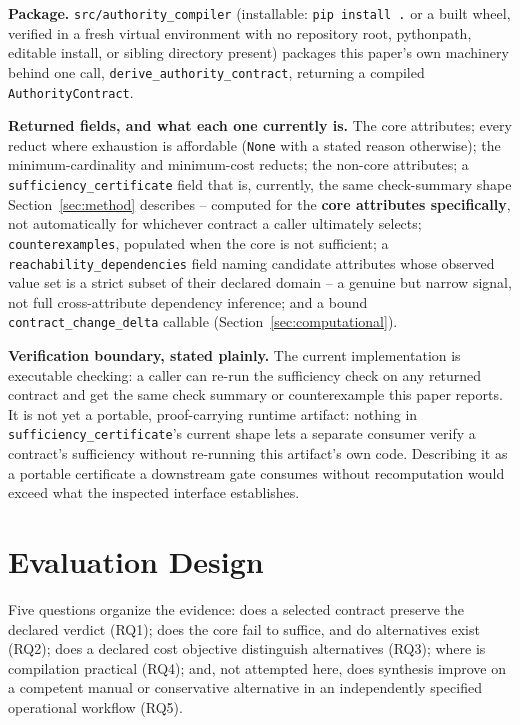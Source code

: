 \documentclass[11pt,a4paper]{article}
\theoremstyle{definition}
\begin{document}
\noindent\textbf{Package.} \texttt{src/authority\_compiler} (installable: \texttt{pip install .} or a built wheel, verified in a fresh virtual environment with no repository root, pythonpath, editable install, or sibling directory present) packages this paper's own machinery behind one call, \texttt{derive\_authority\_contract}, returning a compiled \texttt{AuthorityContract}.

\noindent\textbf{Returned fields, and what each one currently is.} The core attributes; every reduct where exhaustion is affordable (\texttt{None} with a stated reason otherwise); the minimum-cardinality and minimum-cost reducts; the non-core attributes; a \texttt{sufficiency\_certificate} field that is, currently, the same check-summary shape Section~\ref{sec:method} describes -- computed for the \textbf{core attributes specifically}, not automatically for whichever contract a caller ultimately selects; \texttt{counterexamples}, populated when the core is not sufficient; a \texttt{reachability\_dependencies} field naming candidate attributes whose observed value set is a strict subset of their declared domain -- a genuine but narrow signal, not full cross-attribute dependency inference; and a bound \texttt{contract\_change\_delta} callable (Section~\ref{sec:computational}).

\noindent\textbf{Verification boundary, stated plainly.} The current implementation is executable checking: a caller can re-run the sufficiency check on any returned contract and get the same check summary or counterexample this paper reports. It is not yet a portable, proof-carrying runtime artifact: nothing in \texttt{sufficiency\_certificate}'s current shape lets a separate consumer verify a contract's sufficiency without re-running this artifact's own code. Describing it as a portable certificate a downstream gate consumes without recomputation would exceed what the inspected interface establishes.

\section{Evaluation Design}
\label{sec:evaluation}

Five questions organize the evidence: does a selected contract preserve the declared verdict (RQ1); does the core fail to suffice, and do alternatives exist (RQ2); does a declared cost objective distinguish alternatives (RQ3); where is compilation practical (RQ4); and, not attempted here, does synthesis improve on a competent manual or conservative alternative in an independently specified operational workflow (RQ5).
\end{document}
